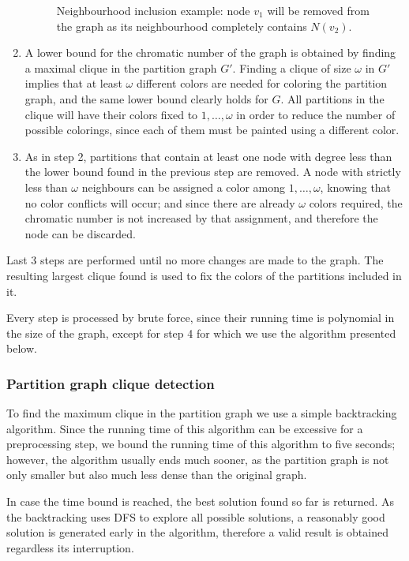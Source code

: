 \begin{enumerate}
\begin{figure}
\begin{tikzpicture}
	\end{tikzpicture} 
\caption{Neighbourhood inclusion example: node $v_1$ will be removed from the graph as its neighbourhood completely contains $N(v_2)$.}
	\label{fig:neighbourinclusion}
\end{figure}
	
	\item{A lower bound for the chromatic number of the graph is obtained by finding a maximal clique in the partition graph $G'$. Finding a clique of size $\omega$ in $G'$ implies that at least $\omega$ different colors are needed for coloring the partition graph, and the same lower bound clearly holds for $G$. All partitions in the clique will have their colors fixed to $1,\ldots,\omega$ in order to reduce the number of possible colorings, since each of them must be painted using a different color.}
	\item{As in step 2, partitions that contain at least one node with degree less than the lower bound found in the previous step are removed. A node with strictly less than $\omega$ neighbours can be assigned a color among $1,\ldots,\omega$, knowing that no color conflicts will occur; and since there are already $\omega$ colors required, the chromatic number is not increased by that assignment, and therefore the node can be discarded.}
\end{enumerate}

Last 3 steps are performed until no more changes are made to the graph. The resulting largest clique found is used to fix the colors of the partitions included in it. 

Every step is processed by brute force, since their running time is polynomial in the size of the graph, except for step 4 for which we use the algorithm presented below.

\subsubsection{Partition graph clique detection}

To find the maximum clique in the partition graph we use a simple backtracking algorithm. Since the running time of this algorithm can be excessive for a preprocessing step, we bound the running time of this algorithm to five seconds; however, the algorithm usually ends much sooner, as the partition graph is not only smaller but also much less dense than the original graph. 

In case the time bound is reached, the best solution found so far is returned. As the backtracking uses DFS to explore all possible solutions, a reasonably good solution is generated early in the algorithm, therefore a valid result is obtained regardless its interruption.

